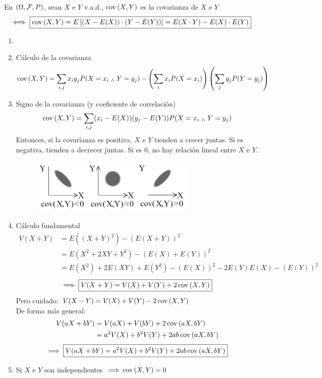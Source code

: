 \begin{defn}[Covarianza]
	En $(\Omega, \mathcal{F}, P)$, sean $X$ e $Y$ v.a.d., $\operatorname{cov}\left(X, Y\right)$ es la covarianza de $X$ e $Y$
	\[\iff \boxed{\operatorname{cov}\left(X, Y\right) = E\left[(X-E(X))\cdot (Y-E(Y))\right] = E(X\cdot Y)-E(X)\cdot E(Y)}\]
\end{defn}


\begin{obs}
	\begin{enumerate}
		\item[]
		\item Cálculo de la covarianza
		      \[\operatorname{cov}\left(X, Y\right) = \sum_{i,j}x_iy_jP(X=x_i \; _{\wedge} \; Y=y_j) - \left(\sum_{i} x_iP(X=x_i)\right)\left(\sum_{j} y_jP(Y=y_j)\right)\]
		\item Signo de la covarianza (y coeficiente de correlación)
		      \[\operatorname{cov}\left(X, Y\right) = \sum_{i,j}(x_i-E(X))(y_j-E(Y))P(X=x_i \; _{\wedge} \; Y=y_j)\]
		      Entonces, si la covarianza es positiva, $X$ e $Y$ tienden a crecer juntas. Si
		      es negativa, tienden a decrecer juntas. Si es 0, no hay relación lineal entre
		      $X$ e $Y$.
		      \begin{figure}[htbp]
			      \centering
			      \vspace{-0.3cm}
			      \includegraphics[width=8cm]{img/covarianza.png}
			      \vspace{-0.6cm}
		      \end{figure}
		\item Cálculo fundamental
		      \begin{align*}
			      V(X+ Y) & = E((X+Y)^2)- (E(X+Y))^2                              \\
			              & = E(X^2+2XY+Y^2)- (E(X)+E(Y))^2                       \\
			              & = E(X^2)+2E(XY)+E(Y^2)- (E(X))^2-2E(Y)E(X) - (E(Y))^2
		      \end{align*}
		      \[\implies \boxed{V(X+ Y) = V(X) + V(Y) + 2\operatorname{cov}\left(X, Y\right)}\]
		      Pero cuidado: $V(X-Y)=V(X) + V(Y) -2\operatorname{cov}\left(X, Y\right)$ \\ De forma más general:
		      \begin{align*}
			      V(aX+ bY) & = V(aX) + V(bY) + 2\operatorname{cov}\left(aX, bY\right)       \\
			                & = a^2V(X) + b^2V(Y) + 2ab\operatorname{cov}\left(aX, bY\right)
		      \end{align*}
		      \[\implies \boxed{V(aX+ bY)=a^2V(X) + b^2V(Y) + 2ab\operatorname{cov}\left(aX, bY\right)}\]
		\item Si $X$ e $Y$ son independientes $\implies \operatorname{cov}\left(X, Y\right)=0$
	\end{enumerate}
\end{obs}

